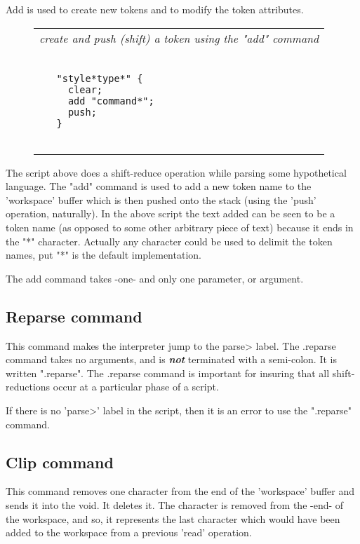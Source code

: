\documentclass[a4paper,12pt]{article}
\begin{document}
  Add is used to create new tokens and to modify the token attributes.
 \begin{figure}
 \begin{tabular}{ l }
 \emph{ create and push (shift) a token using the "add" command } \\ 
 \begin{lstlisting}[breaklines] 

   "style*type*" {
     clear;
     add "command*";
     push;
   }
  
 \end{lstlisting} 
 \end{tabular} 

 \end{figure}

  The script above does a shift-reduce operation while parsing some
  hypothetical language. The "add" command is used to add a new token name to
  the 'workspace' buffer which is then pushed onto the stack (using the 'push'
  operation, naturally). In the above script the text added can be seen to be
  a token name (as opposed to some other arbitrary piece of text) because it
  ends in the "*" character. Actually any character could be used to delimit
  the token names, put "*" is the default implementation.

  The add command takes -one- and only one parameter, or argument.
  
\subsection{Reparse command}

  This command makes the interpreter jump to the parse> label. The .reparse
  command takes no arguments, and is \textbf{\emph{not}} terminated with a semi-colon. It
  is written ".reparse". The .reparse command is important for insuring that
  all shift-reductions occur at a particular phase of a script.
   
  If there is no 'parse>' label in the script, then it is an error to
  use the ".reparse" command.

\subsection{Clip command}
 
 This command removes one character from the end of the 'workspace' buffer and
 sends it into the void. It deletes it. The character is removed from the
 -end- of the workspace, and so, it represents the last character which would
 have been added to the workspace from a previous 'read' operation.
\end{document}
